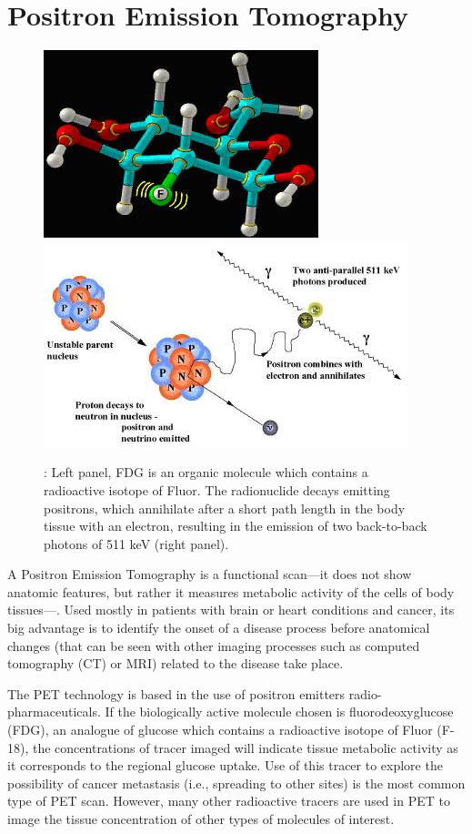 \section{Positron Emission Tomography}
\label{sec.pet}


\begin{figure}[!b]
	\centering
	\includegraphics[scale=0.8]{img/MAPD_radiotracer.jpg}
	\includegraphics[scale=0.8]{img/MAPD_positronelectronannihilation.jpg}
	\caption{\label{fig.fdg}: Left panel, FDG is an organic molecule which contains a radioactive isotope of Fluor. The radionuclide decays emitting positrons, which annihilate after a short path length in the body tissue with an electron, resulting in the emission of two back-to-back photons of 511 keV (right panel). }
\end{figure}

A Positron Emission Tomography is a functional scan---it does not show anatomic features, but rather it measures metabolic activity of the cells of body tissues---. Used mostly in patients with brain or heart conditions and cancer, its big advantage is to identify the onset of a disease process before anatomical changes (that can be seen with other imaging processes such as computed tomography (CT) or MRI) related to the disease take place.

The PET technology  is based in the use of positron emitters radio-pharmaceuticals. 
If the biologically active molecule chosen is fluorodeoxyglucose (FDG), an analogue of glucose which contains a radioactive isotope of Fluor (F-18), the concentrations of tracer imaged will indicate tissue metabolic activity as it corresponds to the regional glucose uptake. Use of this tracer to explore the possibility of cancer metastasis (i.e., spreading to other sites) is the most common type of PET scan. However, many other radioactive tracers are used in PET to image the tissue concentration of other types of molecules of interest. 

